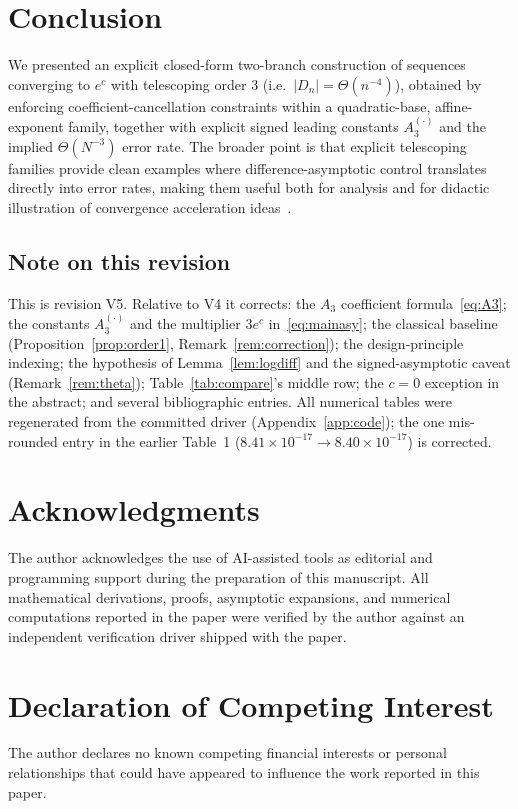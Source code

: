 \documentclass[11pt]{article}
\theoremstyle{definition}
\begin{document}
\section{Conclusion}
We presented an explicit closed-form two-branch construction of sequences
converging to $e^{c}$ with telescoping order $3$ (i.e.\ $|D_n|=\Theta(n^{-4})$),
obtained by enforcing coefficient-cancellation constraints within a
quadratic-base, affine-exponent family, together with explicit signed leading
constants $A_3^{(\cdot)}$ and the implied $\Theta(N^{-3})$ error rate. The broader
point is that explicit telescoping families provide clean examples where
difference-asymptotic control translates directly into error rates, making them
useful both for analysis and for didactic illustration of convergence
acceleration ideas~\cite{dlmf39}.

\subsection*{Note on this revision}
This is revision V5. Relative to V4 it corrects: the $A_3$ coefficient
formula~\eqref{eq:A3}; the constants $A_3^{(\cdot)}$ and the multiplier
$3e^{c}$ in~\eqref{eq:mainasy}; the classical baseline
(Proposition~\ref{prop:order1}, Remark~\ref{rem:correction}); the design-principle
indexing; the hypothesis of Lemma~\ref{lem:logdiff} and the signed-asymptotic
caveat (Remark~\ref{rem:theta}); Table~\ref{tab:compare}'s middle row; the
$c=0$ exception in the abstract; and several bibliographic entries. All numerical
tables were regenerated from the committed driver
(Appendix~\ref{app:code}); the one mis-rounded entry in the earlier Table~1
($8.41\times10^{-17}\to8.40\times10^{-17}$) is corrected.

\section*{Acknowledgments}
The author acknowledges the use of AI-assisted tools as editorial and programming
support during the preparation of this manuscript. All mathematical derivations,
proofs, asymptotic expansions, and numerical computations reported in the paper
were verified by the author against an independent verification driver shipped
with the paper.

\section*{Declaration of Competing Interest}
The author declares no known competing financial interests or personal
relationships that could have appeared to influence the work reported in this
paper.
\end{document}
